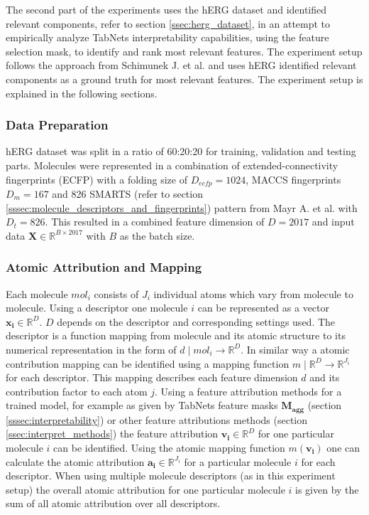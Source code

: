 \documentclass[../main.tex]{subfiles}
\begin{document}
The second part of the experiments uses the hERG dataset and identified relevant components, refer to section \ref{ssec:herg_dataset}, in an attempt to empirically analyze TabNets interpretability capabilities, using the feature selection mask, to identify and rank most relevant features. The experiment setup follows the approach from Schimunek J. et al. \cite{schimunek_poster_2021} and uses hERG identified relevant components as a ground truth for most relevant features. The experiment setup is explained in the following sections.

\subsubsection{Data Preparation} 

hERG dataset was split in a ratio of 60:20:20 for training, validation and testing parts. Molecules were represented in a combination of extended-connectivity fingerprints (ECFP) with a folding size of $D_{ecfp}=1024$, MACCS fingerprints $D_{m}=167$ and 826 SMARTS (refer to section \ref{sssec:molecule_descriptors_and_fingerprints}) pattern from Mayr A. et al. \cite{DeepTox} with $D_{t}=826$. This resulted in a combined feature dimension of $D=2017$ and input data $\mathbf{X} \in \mathbb{R}^{B \times 2017}$ with $B$ as the batch size.

\subsubsection{Atomic Attribution and Mapping}

Each molecule $mol_{i}$ consists of $J_i$ individual atoms which vary from molecule to molecule. Using a descriptor one molecule $i$ can be represented as a vector $\mathbf{x_i} \in \mathbb{R}^{D}$. $D$ depends on the descriptor and corresponding settings used. The descriptor is a function mapping from molecule and its atomic structure to its numerical representation in the form of $d \mid mol_i \rightarrow \mathbb{R}^D$. In similar way a atomic contribution mapping can be identified using a mapping function $m \mid \mathbb{R}^D \rightarrow \mathbb{R}^{J_i}$ for each descriptor. This mapping describes each feature dimension $d$ and its contribution factor to each atom $j$.
Using a feature attribution methods for a trained model, for example as given by TabNets feature masks $\mathbf{M_{agg}}$ (section \ref{sssec:interpretability}) or other feature attributions methods (section \ref{ssec:interpret_methods}) the feature attribution $\mathbf{v_i} \in \mathbb{R}^{D}$ for one particular molecule $i$ can be identified. Using the atomic mapping function $m(\mathbf{v_i})$ one can calculate the atomic attribution $\mathbf{a_i} \in \mathbb{R}^{J_i}$ for a particular molecule $i$ for each descriptor. When using multiple molecule descriptors (as in this experiment setup) the overall atomic attribution for one particular molecule $i$ is given by the sum of all atomic attribution over all descriptors. 
\end{document}
